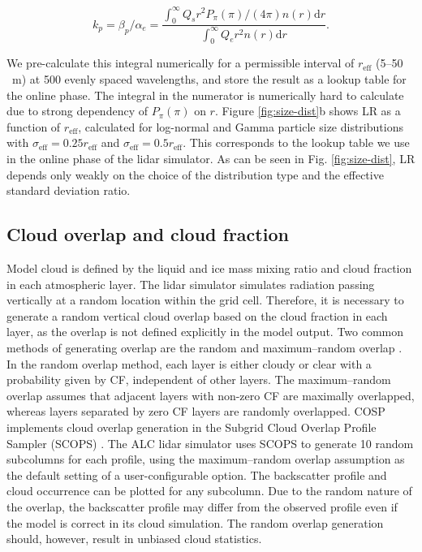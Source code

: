 \begin{equation}
k_p = \beta_p/\alpha_e = \frac{\int_0^\infty Q_s r^2 P_\pi(\pi)/(4\pi) n(r) \mathrm{d}r}{\int_0^\infty Q_e r^2 n(r) \mathrm{d}r} .
\end{equation}

We pre-calculate this integral numerically for a permissible interval of
$r_\text{eff}$ (5--50 \unit{\mu m}) at 500 evenly spaced wavelengths,
and store the result as a lookup table for the online phase.
The integral in the numerator is numerically hard to calculate due
to strong dependency of $P_\pi(\pi)$ on $r$.
Figure \ref{fig:size-dist}b
shows LR as a function of $r_\text{eff}$, calculated
for log-normal and Gamma particle size distributions with $\sigma_\text{eff}
= 0.25 r_\text{eff}$ and $\sigma_\text{eff} = 0.5 r_\text{eff}$.
This corresponds to the lookup table we use in the online phase
of the lidar simulator. As can be seen in Fig. \ref{fig:size-dist},
LR depends only weakly on the choice of the distribution type and the effective standard
deviation ratio.

\subsection{Cloud overlap and cloud fraction}

Model cloud is defined by the liquid and ice mass mixing ratio and cloud
fraction in each atmospheric layer. The lidar simulator simulates radiation
passing vertically at a random location within the grid cell. Therefore,
it is necessary to generate a random vertical cloud overlap based on the cloud
fraction in each layer, as the overlap is not defined explicitly in the model output.
Two common methods of generating overlap are the
random and maximum--random overlap \citep{geleyn1979}. In the random overlap method,
each layer is either cloudy or clear with
a probability given by CF, independent of other layers.
The maximum--random overlap assumes that adjacent layers with non-zero CF are maximally
overlapped, whereas layers separated by zero CF layers are randomly overlapped.
COSP implements cloud overlap generation in the
Subgrid Cloud Overlap Profile Sampler (SCOPS)
\citep{klein1999,webb2001,chepfer2008}. The ALC lidar simulator uses SCOPS to
generate 10 random subcolumns for each profile, using the maximum--random
overlap assumption as the default setting of a user-configurable option.
The backscatter profile and cloud occurrence can be plotted for any subcolumn.
Due to the random nature of the overlap, the backscatter profile may differ
from the observed profile even if the model is correct in its cloud simulation.
The random overlap generation should, however, result in unbiased cloud
statistics.

